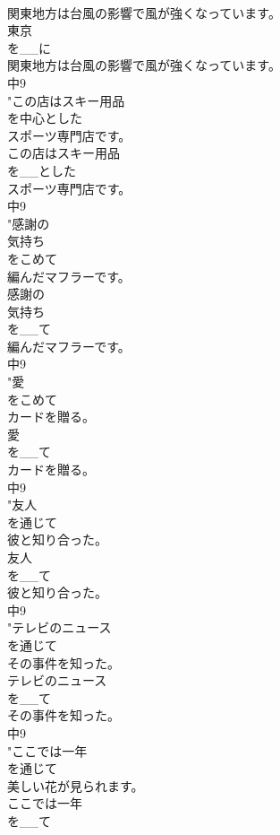 \documentclass[8pt]{extreport}
\begin{document}
\begin{CJK}{UTF8}{min}
\\	関東地方は台風の影響で風が強くなっています。
\\	東京
\\	を__に
\\	関東地方は台風の影響で風が強くなっています。
\\	中9
\\	"この店はスキー用品
\\	を中心とした
\\	スポーツ専門店です。
\\	この店はスキー用品
\\	を__とした
\\	スポーツ専門店です。
\\	中9
\\	"感謝の
\\	気持ち
\\	をこめて
\\	編んだマフラーです。
\\	感謝の
\\	気持ち
\\	を__て
\\	編んだマフラーです。
\\	中9
\\	"愛
\\	をこめて
\\	カードを贈る。
\\	愛
\\	を__て
\\	カードを贈る。
\\	中9
\\	"友人
\\	を通じて
\\	彼と知り合った。
\\	友人
\\	を__て
\\	彼と知り合った。
\\	中9
\\	"テレビのニュース
\\	を通じて
\\	その事件を知った。
\\	テレビのニュース
\\	を__て
\\	その事件を知った。
\\	中9
\\	"ここでは一年
\\	を通じて
\\	美しい花が見られます。
\\	ここでは一年
\\	を__て

\end{CJK}
\end{document}
